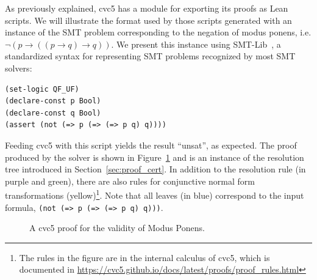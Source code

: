 As previously explained, cvc5 has a module for exporting its proofs as Lean scripts.
We will illustrate the format used by those scripts generated with an instance of the SMT problem corresponding
to the negation of modus ponens, i.e. $\neg (p \rightarrow ((p \rightarrow q) \rightarrow q))$.
We present this instance using SMT-Lib~\cite{smtlib}, a standardized syntax for
representing SMT problems recognized by most SMT solvers:

\begin{verbatim}
(set-logic QF_UF)
(declare-const p Bool)
(declare-const q Bool)
(assert (not (=> p (=> (=> p q) q))))
\end{verbatim}

Feeding cvc5 with this script yields the result ``unsat'', as expected. The proof produced by the solver is shown in Figure~\ref{fig:cvc5-proof} and is an instance of the resolution tree introduced in Section~\ref{sec:proof_cert}. In addition to the resolution rule (in purple and green), there are also rules for conjunctive normal form transformations (yellow)\footnote{The rules in the figure are in the internal calculus of cvc5, which is documented in \url{https://cvc5.github.io/docs/latest/proofs/proof_rules.html}}. Note that all leaves (in blue) correspond to the input formula, \texttt{(not (=> p (=> (=> p q) q)))}.

\makeatletter
\setlength{\@fptop}{0pt}
\makeatother

\begin{figure}[t!]
  \centering
  \caption{A cvc5 proof for the validity of Modus Ponens.}
  \label{fig:cvc5-proof}
\end{figure}

